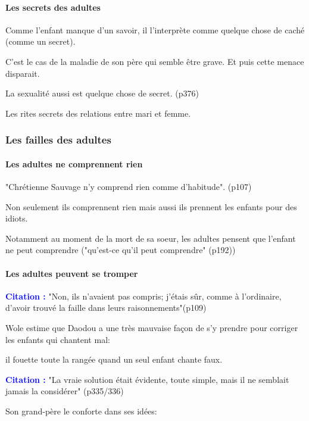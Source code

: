 \documentclass[a4paper, 11pt, hidelinks]{article}
\newcommand{\bs}{\bigskip}
\newcommand{\cit}{\large \textcolor{blue}{\textbf{Citation :}} \large }
\begin{document}
\paragraph{Les secrets des adultes}

Comme l'enfant manque d'un savoir, il l'interprète comme quelque chose de caché (comme un secret).


C'est le cas de la maladie de son père qui semble être grave. Et puis cette menace disparait. 

\bs

La sexualité aussi est quelque chose de secret. (p376)

Les rites secrets des relations entre mari et femme.


\subsubsection{Les failles des adultes}

\paragraph{Les adultes ne comprennent rien}

"Chrétienne Sauvage n'y comprend rien comme d'habitude". (p107)


Non seulement ils comprennent rien mais aussi ils prennent les enfants pour des idiots.


Notamment au moment de la mort de sa soeur, les adultes pensent que l'enfant ne peut comprendre ("qu'est-ce qu'il peut comprendre" (p192))


\paragraph{Les adultes peuvent se tromper}

\cit "Non, ils n'avaient pas compris; j'étais sûr, comme à l'ordinaire, d'avoir trouvé la faille dans leurs raisonnements"(p109)

\bs

Wole estime que Daodou a une très mauvaise façon de s'y prendre pour corriger les enfants qui chantent mal:

il fouette toute la rangée quand un seul enfant chante faux.

\cit "La vraie solution était évidente, toute simple, mais il ne semblait jamais la considérer" (p335/336)

\bs

Son grand-père le conforte dans ses idées:
\end{document}
